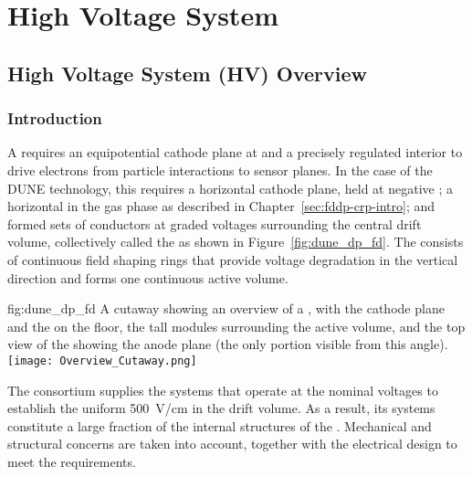 \chapter{High Voltage System}
\label{ch:fddp-hv}

\section{High Voltage System (HV) Overview}
\label{sec:fddp-hv-ov}


\subsection{Introduction}
\label{sec:fddp-hv-intro}

A  requires an equipotential cathode plane at  and a precisely regulated interior \efield to drive 
electrons from particle interactions to sensor planes.  In the case of the DUNE  technology, 
this requires a horizontal cathode plane, held at negative ; a horizontal  in the gas phase as described in  Chapter~\ref{sec:fddp-crp-intro}; and formed sets of conductors at graded voltages surrounding the central drift volume, collectively called the  as shown in Figure~\ref{fig:dune_dp_fd}. The  consists of continuous field shaping rings that provide voltage degradation in the vertical direction and forms one continuous active volume.


\begin{dunefigure}{fig:dune_dp_fd}
{A cutaway showing an overview of a , with the cathode plane and the  on the floor, the \tpcheight tall  modules surrounding the active volume, and the top view of the %
  showing the anode plane (the only portion visible from this angle).}
\texttt{[image: Overview\_Cutaway.png]}
\end{dunefigure}

The  consortium supplies the systems that operate at the nominal voltages to establish the uniform \SI{500}{\volt/\cm} \efield in the  drift volume. As a result, its systems %
constitute a large fraction of the %
internal structures of the . %
Mechanical and structural concerns are taken into account, together with the electrical design to meet the requirements. 

